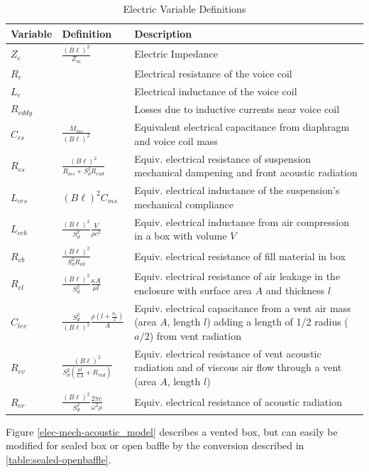 \documentclass[10pt]{book}
\begin{document}
\begin{table}
\centering
\renewcommand{\arraystretch}{1.5}
\begin{tabularx}{\textwidth}{@{} ll X @{}}
\toprule
Variable & Definition & Description \\
\midrule
$Z_e$ & $\frac{(B\ell)^2}{Z_m}$ & Electric Impedance\\
$R_e$ & & Electrical resistance of the voice coil\\
$L_e$ & & Electrical inductance of the voice coil\\
$R_{eddy}$ & & Losses due to inductive currents near voice coil\\
$C_{es}$ & $\frac{M_{ms}}{(B\ell)^2}$ & Equivalent electrical capacitance from diaphragm and voice coil mass\\
$R_{es}$ & $\frac{(B\ell)^2}{R_{ms}+S_d^2R_{rad}}$ & Equiv. electrical resistance of suspension mechanical dampening and front acoustic radiation\\
$L_{ces}$ & $(B\ell)^2C_{ms}$ & Equiv. electrical inductance of the suspension's mechanical compliance\\
$L_{ceb}$ & $\frac{(B\ell)^2}{S_d^2} \frac{V}{\rho c^2}$ & Equiv. electrical inductance from air compression in a box with volume $V$\\
$R_{eb}$ & $\frac{(B\ell)^2}{S_d^2 R_{ab}}$ & Equiv. electrical resistance of fill material in box\\
$R_{el}$ & $\frac{(B\ell)^2}{S_d^2 } \frac{\kappa A}{\mu l}$ & Equiv. electrical resistance of air leakage in the enclosure with surface area $A$ and thickness $l$\\
$C_{lev}$ & $\frac{S_d^2}{(B\ell)^2}\frac{\rho \left(l+\frac{a_v}{2}\right)}{A}$ & Equiv. electrical capacitance from a vent air mass (area $A$, length $l$) adding a length of 1/2 radius ($a/2$) from vent radiation\\
$R_{ev}$ & $\frac{(B\ell)^2}{S_d^2\left( \frac{\mu l}{\kappa A}+R_{rad}\right)}$ & Equiv. electrical resistance of vent acoustic radiation and of viscous air flow through a vent (area $A$, length $l$)\\
$R_{er}$ & $\frac{(B\ell)^2}{S_d^2}\frac{2\pi c}{\omega^2 \rho}$& Equiv. electrical resistance of acoustic radiation\\
\bottomrule
\end{tabularx}
\caption{Electric Variable Definitions}\label{table:variables}
\end{table}

Figure \ref{elec-mech-acoustic_model} describes a vented box, but can easily be modified for sealed box or open baffle by the conversion described in \ref{table:sealed-openbaffle}.
\end{document}
